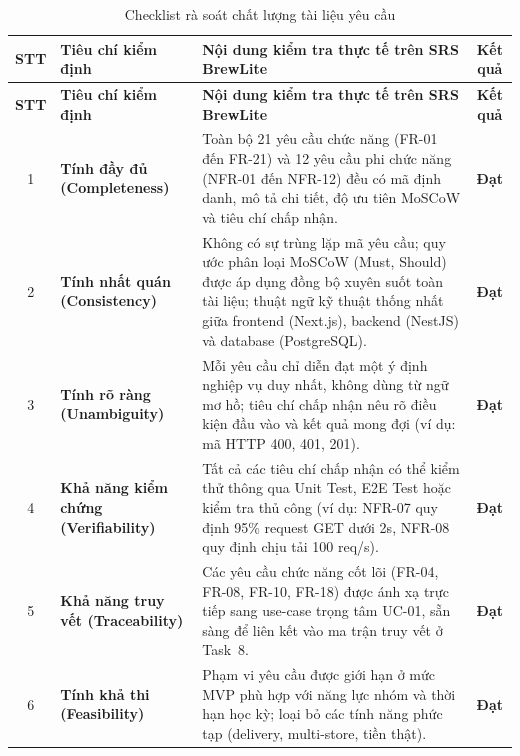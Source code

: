 \documentclass[a4paper]{article}
\begin{document}
\begingroup
\renewcommand{\arraystretch}{1.25}
\setlength{\tabcolsep}{5pt}
\setlength{\arrayrulewidth}{0.5pt}
\begin{longtable}{|c|p{4.2cm}|p{6.8cm}|c|}
\caption{Checklist rà soát chất lượng tài liệu yêu cầu}
\label{tab:quality-checklist} \\
\hline
\textbf{STT} & \textbf{Tiêu chí kiểm định} & \textbf{Nội dung kiểm tra thực tế trên SRS BrewLite} & \textbf{Kết quả} \\ \hline
\endfirsthead
\hline
\textbf{STT} & \textbf{Tiêu chí kiểm định} & \textbf{Nội dung kiểm tra thực tế trên SRS BrewLite} & \textbf{Kết quả} \\ \hline
\endhead
\endfoot
\endlastfoot

1 & \textbf{Tính đầy đủ (Completeness)} & Toàn bộ 21 yêu cầu chức năng (FR-01 đến FR-21) và 12 yêu cầu phi chức năng (NFR-01 đến NFR-12) đều có mã định danh, mô tả chi tiết, độ ưu tiên MoSCoW và tiêu chí chấp nhận. & \textbf{Đạt} \\ \hline

2 & \textbf{Tính nhất quán (Consistency)} & Không có sự trùng lặp mã yêu cầu; quy ước phân loại MoSCoW (Must, Should) được áp dụng đồng bộ xuyên suốt toàn tài liệu; thuật ngữ kỹ thuật thống nhất giữa frontend (Next.js), backend (NestJS) và database (PostgreSQL). & \textbf{Đạt} \\ \hline

3 & \textbf{Tính rõ ràng (Unambiguity)} & Mỗi yêu cầu chỉ diễn đạt một ý định nghiệp vụ duy nhất, không dùng từ ngữ mơ hồ; tiêu chí chấp nhận nêu rõ điều kiện đầu vào và kết quả mong đợi (ví dụ: mã HTTP 400, 401, 201). & \textbf{Đạt} \\ \hline

4 & \textbf{Khả năng kiểm chứng (Verifiability)} & Tất cả các tiêu chí chấp nhận có thể kiểm thử thông qua Unit Test, E2E Test hoặc kiểm tra thủ công (ví dụ: NFR-07 quy định 95\% request GET dưới 2s, NFR-08 quy định chịu tải 100 req/s). & \textbf{Đạt} \\ \hline

5 & \textbf{Khả năng truy vết (Traceability)} & Các yêu cầu chức năng cốt lõi (FR-04, FR-08, FR-10, FR-18) được ánh xạ trực tiếp sang use-case trọng tâm UC-01, sẵn sàng để liên kết vào ma trận truy vết ở Task~8. & \textbf{Đạt} \\ \hline

6 & \textbf{Tính khả thi (Feasibility)} & Phạm vi yêu cầu được giới hạn ở mức MVP phù hợp với năng lực nhóm và thời hạn học kỳ; loại bỏ các tính năng phức tạp (delivery, multi-store, tiền thật). & \textbf{Đạt} \\ \hline

\end{longtable}
\endgroup
\end{document}

